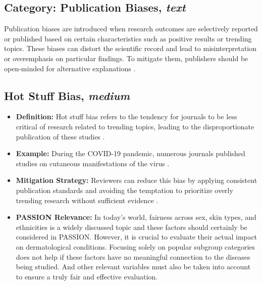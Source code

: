 \documentclass[12pt, a4paper, oneside]{book}   	%
\begin{document}
\begin{appendices}
		\section{Category: Publication Biases, \textit{text}} \label{app:biasCategoryPublicationBias}
		Publication biases are introduced when research outcomes are selectively reported or published based on certain characteristics such as positive results or trending topics. These biases can distort the scientific record and lead to misinterpretation or overemphasis on particular findings. To mitigate them, publishers should be open-minded for alternative explanations \autocite{Chakraborty_2024}.
		
		\subsection{Hot Stuff Bias, \textit{medium}}
		\begin{itemize}
			\item \textbf{Definition:} Hot stuff bias refers to the tendency for journals to be less critical of research related to trending topics, leading to the disproportionate publication of these studies \autocite{Chakraborty_2024}.
			\item \textbf{Example:} During the COVID-19 pandemic, numerous journals published studies on cutaneous manifestations of the virus \autocite{Chakraborty_2024}.
			\item \textbf{Mitigation Strategy:} Reviewers can reduce this bias by applying consistent publication standards and avoiding the temptation to prioritize overly trending research without sufficient evidence \autocite{Chakraborty_2024}.
			\item \textbf{PASSION Relevance:} In today’s world, fairness across sex, skin types, and ethnicities is a widely discussed topic and these factors should certainly be considered in PASSION. However, it is crucial to evaluate their actual impact on dermatological conditions. Focusing solely on popular subgroup categories does not help if these factors have no meaningful connection to the diseases being studied. And other relevant variables must also be taken into account to ensure a truly fair and effective evaluation.
		\end{itemize}
		

\end{appendices}
\end{document}
